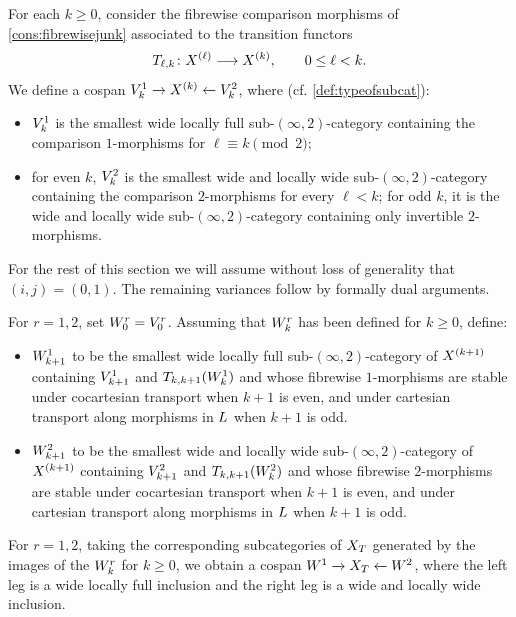 \documentclass[a4paper,reqno,twoside]{amsart}
\begin{document}
\begin{definition}\label{def:cwclean}
	For each $k\geq0$, consider the fibrewise comparison morphisms of \cref{cons:fibrewisejunk} associated to the transition functors
	\[
		T_{\ell,k}\colon\relax{X}^{(\ell)}\longrightarrow\relax{X}^{(k)},
		\qquad 0\leq\ell<k.
	\]
	We define a cospan $\relax{V}_k^1 \xrightarrow{}\relax{X}^{(k)} \xleftarrow{} \relax{V}_k^2$, where (cf. \cref{def:typeofsubcat}):
	\begin{itemize}
		\item $\relax{V}_k^1$ is the smallest wide locally full sub-$(\infty,2)$-category containing the comparison $1$-morphisms for $\ell\equiv k\pmod 2$;
		\item for even $k$, $\relax{V}_k^2$ is the smallest wide and locally wide sub-$(\infty,2)$-category containing the comparison $2$-morphisms for every $\ell<k$; for odd $k$, it is the wide and locally wide sub-$(\infty,2)$-category containing only invertible $2$-morphisms.
	\end{itemize}
\end{definition}

For the rest of this section we will assume without loss of generality that $(i,j)=(0,1)$. The remaining variances follow by formally dual arguments.


\begin{definition}\label{def:cwfinal}
	 For $r=1,2$, set $\relax{W}_0^r=\relax{V}_0^r$. Assuming that $\relax{W}_k^r$ has been defined for $k\geq0$, define:
	\begin{itemize}
		\item $\relax{W}_{k+1}^{1}$ to be the smallest wide locally full sub-$(\infty,2)$-category of $\relax{X}^{(k+1)}$ containing $\relax{V}^{1}_{k+1}$ and $T_{k,k+1}(\relax{W}_{k}^{1})$ and whose fibrewise $1$-morphisms are stable under cocartesian transport when $k+1$ is even, and under cartesian transport along morphisms in $\relax{L}$ when $k+1$ is odd.
		\item $\relax{W}_{k+1}^{2}$ to be the smallest wide and locally wide sub-$(\infty,2)$-category of $\relax{X}^{(k+1)}$ containing $\relax{V}^{2}_{k+1}$ and $T_{k,k+1}(\relax{W}_{k}^{2})$ and whose fibrewise $2$-morphisms are stable under cocartesian transport when $k+1$ is even, and under cartesian transport along morphisms in $\relax{L}$ when $k+1$ is odd.
	\end{itemize}
	For $r=1,2$, taking the corresponding subcategories of $\relax{X}_T$ generated by the images of the $\relax{W}_k^r$ for $k\geq0$, we obtain a cospan $\relax{W}^1 \xrightarrow{} \relax{X}_T \xleftarrow{} \relax{W}^2$, where the left leg is a wide locally full inclusion and the right leg is a wide and locally wide inclusion.
\end{definition}
\end{document}
